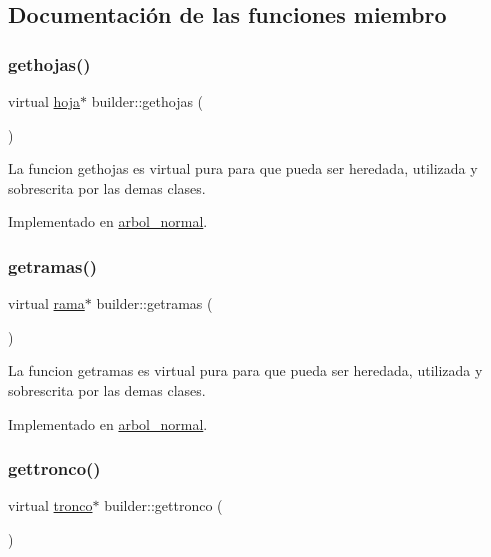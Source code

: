 \subsection{Documentación de las funciones miembro}
\mbox{\label{classbuilder_a03de42e8ec33a22c3635a6e946061b70}} 
\subsubsection{\texorpdfstring{gethojas()}{gethojas()}}
{\footnotesize\ttfamily virtual \hyperlink{classhoja}{hoja}$\ast$ builder\+::gethojas (\begin{DoxyParamCaption}{ }\end{DoxyParamCaption})\hspace{0.3cm}{\ttfamily [pure virtual]}}

La funcion gethojas es virtual pura para que pueda ser heredada, utilizada y sobrescrita por las demas clases. 

Implementado en \hyperlink{classarbol__normal_a999f324b73ff973d4b5b49e2403c637b}{arbol\+\_\+normal}.

\mbox{\label{classbuilder_a7b811cc1a2cffe9f3601faab0d85627b}} 
\subsubsection{\texorpdfstring{getramas()}{getramas()}}
{\footnotesize\ttfamily virtual \hyperlink{classrama}{rama}$\ast$ builder\+::getramas (\begin{DoxyParamCaption}{ }\end{DoxyParamCaption})\hspace{0.3cm}{\ttfamily [pure virtual]}}

La funcion getramas es virtual pura para que pueda ser heredada, utilizada y sobrescrita por las demas clases. 

Implementado en \hyperlink{classarbol__normal_a34c202fa845954e82719d3e86a5a0d9e}{arbol\+\_\+normal}.

\mbox{\label{classbuilder_af81e62bdfc53bbdad5f1d8edc4b46ecd}} 
\subsubsection{\texorpdfstring{gettronco()}{gettronco()}}
{\footnotesize\ttfamily virtual \hyperlink{classtronco}{tronco}$\ast$ builder\+::gettronco (\begin{DoxyParamCaption}{ }\end{DoxyParamCaption})\hspace{0.3cm}{\ttfamily [pure virtual]}}

